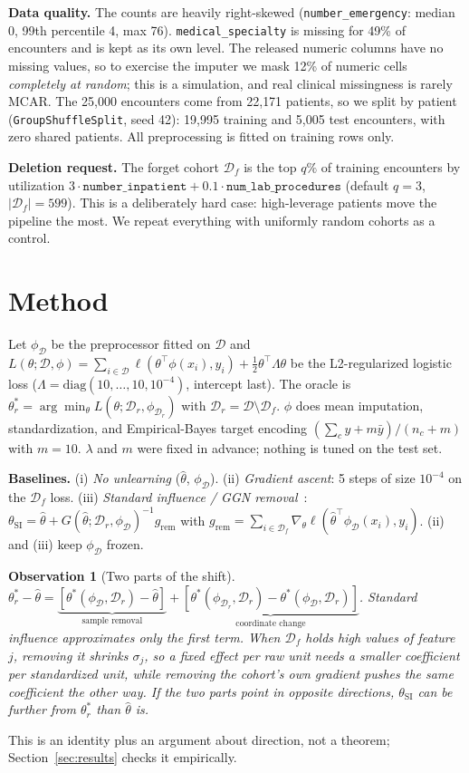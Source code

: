 \documentclass{article}
\newtheorem{observation}{Observation}
\newcommand{\Df}{\mathcal{D}_f}
\newcommand{\Dr}{\mathcal{D}_r}
\newcommand{\D}{\mathcal{D}}
\begin{document}
\textbf{Data quality.} The counts are heavily right-skewed (\texttt{number\_emergency}: median 0,
99th percentile 4, max 76). \texttt{medical\_specialty} is missing for 49\% of encounters and is kept
as its own level. The released numeric columns have no missing values, so to exercise the imputer
we mask 12\% of numeric cells \emph{completely at random}; this is a simulation, and real clinical
missingness is rarely MCAR. The 25{,}000 encounters come from 22{,}171 patients, so we split by
patient (\texttt{GroupShuffleSplit}, seed 42): 19{,}995 training and 5{,}005 test encounters, with
zero shared patients. All preprocessing is fitted on training rows only.

\textbf{Deletion request.} The forget cohort $\Df$ is the top $q\%$ of training encounters by
utilization $3\cdot\texttt{number\_inpatient}+0.1\cdot\texttt{num\_lab\_procedures}$ (default $q=3$,
$|\Df|=599$). This is a deliberately hard case: high-leverage patients move the pipeline the most.
We repeat everything with uniformly random cohorts as a control.

\section{Method}
\label{sec:method}
Let $\phi_\D$ be the preprocessor fitted on $\D$ and
$L(\theta;\D,\phi)=\sum_{i\in\D}\ell(\theta^\top\phi(x_i),y_i)+\tfrac12\theta^\top\Lambda\theta$
be the L2-regularized logistic loss ($\Lambda=\mathrm{diag}(10,\dots,10,10^{-4})$, intercept last).
The oracle is $\theta_r^*=\arg\min_\theta L(\theta;\Dr,\phi_{\Dr})$ with $\Dr=\D\setminus\Df$.
$\phi$ does mean imputation, standardization, and Empirical-Bayes target encoding
$(\sum_{c}y+m\bar y)/(n_c+m)$ with $m=10$. $\lambda$ and $m$ were fixed in advance; nothing is
tuned on the test set.

\textbf{Baselines.} (i) \emph{No unlearning} ($\hat\theta$, $\phi_\D$). (ii) \emph{Gradient ascent}:
5 steps of size $10^{-4}$ on the $\Df$ loss. (iii) \emph{Standard influence / GGN removal}~\cite{koh2017,guo2020}:
$\theta_{\mathrm{SI}}=\hat\theta+G(\hat\theta;\Dr,\phi_\D)^{-1}g_{\mathrm{rem}}$ with
$g_{\mathrm{rem}}=\sum_{i\in\Df}\nabla_\theta\ell(\hat\theta^\top\phi_\D(x_i),y_i)$. (ii) and (iii) keep $\phi_\D$ frozen.

\begin{observation}[Two parts of the shift]
$\theta_r^*-\hat\theta=\underbrace{[\theta^*(\phi_\D,\Dr)-\hat\theta]}_{\text{sample removal}}+
\underbrace{[\theta^*(\phi_{\Dr},\Dr)-\theta^*(\phi_\D,\Dr)]}_{\text{coordinate change}}$.
Standard influence approximates only the first term. When $\Df$ holds high values of feature $j$,
removing it shrinks $\sigma_j$, so a fixed effect per raw unit needs a \emph{smaller} coefficient per
standardized unit, while removing the cohort's own gradient pushes the same coefficient the other
way. If the two parts point in opposite directions, $\theta_{\mathrm{SI}}$ can be further from
$\theta_r^*$ than $\hat\theta$ is.
\end{observation}
This is an identity plus an argument about direction, not a theorem; Section~\ref{sec:results}
checks it empirically.
\end{document}
